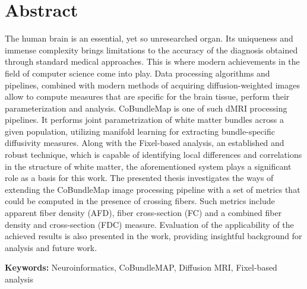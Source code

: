 \documentclass[thesis.tex]{subfiles}
\begin{document}
\chapter{Abstract}

The human brain is an essential, yet so unresearched organ. Its uniqueness and immense complexity brings limitations to the accuracy of the diagnosis obtained through standard medical approaches. This is where modern achievements in the field of computer science come into play. Data processing algorithms and pipelines, combined with modern methods of acquiring diffusion-weighted images allow to compute measures that are specific for the brain tissue, perform their parameterization and analysis. CoBundleMap is one of such dMRI processing pipelines. It performs joint parametrization of white matter bundles across a given population, utilizing manifold learning for extracting bundle-specific diffusivity measures. Along with the Fixel-based analysis, an established and robust technique, which is capable of identifying local differences and correlations in the structure of white matter, the aforementioned system plays a significant role as a basis for this work. The presented thesis investigates the ways of extending the CoBundleMap image processing pipeline with a set of metrics that could be computed in the presence of crossing fibers. Such metrics include apparent fiber density (AFD), fiber cross-section (FC) and a combined fiber density and cross-section (FDC) measure. Evaluation of the applicability of the achieved results is also presented in the work, providing insightful background for analysis and future work.

\textbf{Keywords:} Neuroinformatics, CoBundleMAP, Diffusion MRI, Fixel-based analysis

\thispagestyle{empty}
\end{document}

